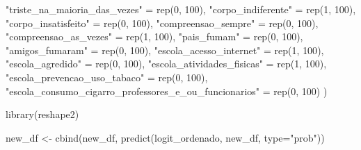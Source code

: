 \documentclass[
]{article}
\newenvironment{Shaded}{\begin{snugshade}}{\end{snugshade}}
\newcommand{\AttributeTok}[1]{\textcolor[rgb]{0.40,0.45,0.13}{#1}}
\newcommand{\DecValTok}[1]{\textcolor[rgb]{0.68,0.00,0.00}{#1}}
\newcommand{\FunctionTok}[1]{\textcolor[rgb]{0.28,0.35,0.67}{#1}}
\newcommand{\NormalTok}[1]{\textcolor[rgb]{0.00,0.23,0.31}{#1}}
\newcommand{\OtherTok}[1]{\textcolor[rgb]{0.00,0.23,0.31}{#1}}
\newcommand{\StringTok}[1]{\textcolor[rgb]{0.13,0.47,0.30}{#1}}
\begin{document}
\begin{Shaded}
\begin{Highlighting}[]
  \StringTok{"triste\_na\_maioria\_das\_vezes"} \OtherTok{=} \FunctionTok{rep}\NormalTok{(}\DecValTok{0}\NormalTok{, }\DecValTok{100}\NormalTok{),}
  \StringTok{"corpo\_indiferente"} \OtherTok{=} \FunctionTok{rep}\NormalTok{(}\DecValTok{1}\NormalTok{, }\DecValTok{100}\NormalTok{),}
  \StringTok{"corpo\_insatisfeito"} \OtherTok{=} \FunctionTok{rep}\NormalTok{(}\DecValTok{0}\NormalTok{, }\DecValTok{100}\NormalTok{),}
  \StringTok{"compreensao\_sempre"} \OtherTok{=} \FunctionTok{rep}\NormalTok{(}\DecValTok{0}\NormalTok{, }\DecValTok{100}\NormalTok{),}
  \StringTok{"compreensao\_as\_vezes"} \OtherTok{=} \FunctionTok{rep}\NormalTok{(}\DecValTok{1}\NormalTok{, }\DecValTok{100}\NormalTok{),}
  \StringTok{"pais\_fumam"} \OtherTok{=} \FunctionTok{rep}\NormalTok{(}\DecValTok{0}\NormalTok{, }\DecValTok{100}\NormalTok{),}
  \StringTok{"amigos\_fumaram"} \OtherTok{=} \FunctionTok{rep}\NormalTok{(}\DecValTok{0}\NormalTok{, }\DecValTok{100}\NormalTok{),}
  \StringTok{"escola\_acesso\_internet"} \OtherTok{=} \FunctionTok{rep}\NormalTok{(}\DecValTok{1}\NormalTok{, }\DecValTok{100}\NormalTok{),}
  \StringTok{"escola\_agredido"} \OtherTok{=} \FunctionTok{rep}\NormalTok{(}\DecValTok{0}\NormalTok{, }\DecValTok{100}\NormalTok{),}
  \StringTok{"escola\_atividades\_fisicas"} \OtherTok{=} \FunctionTok{rep}\NormalTok{(}\DecValTok{1}\NormalTok{, }\DecValTok{100}\NormalTok{),}
  \StringTok{"escola\_prevencao\_uso\_tabaco"} \OtherTok{=} \FunctionTok{rep}\NormalTok{(}\DecValTok{0}\NormalTok{, }\DecValTok{100}\NormalTok{),}
  \StringTok{"escola\_consumo\_cigarro\_professores\_e\_ou\_funcionarios"} \OtherTok{=} \FunctionTok{rep}\NormalTok{(}\DecValTok{0}\NormalTok{, }\DecValTok{100}\NormalTok{)}
\NormalTok{)}
\end{Highlighting}
\end{Shaded}

\begin{Shaded}
\begin{Highlighting}[]
\FunctionTok{library}\NormalTok{(reshape2)}

\NormalTok{new\_df }\OtherTok{\textless{}{-}} \FunctionTok{cbind}\NormalTok{(new\_df, }\FunctionTok{predict}\NormalTok{(logit\_ordenado, new\_df, }\AttributeTok{type=}\StringTok{"prob"}\NormalTok{))}
\end{Highlighting}
\end{Shaded}
\end{document}
